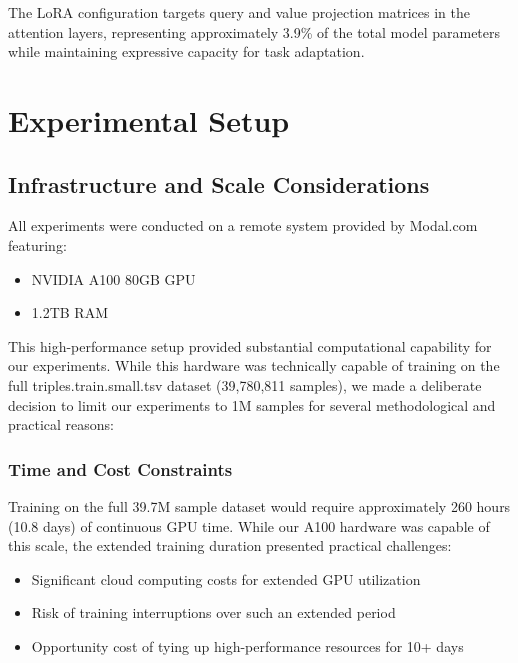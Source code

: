 \documentclass[conference]{IEEEtran}
\begin{document}
The LoRA configuration targets query and value projection matrices in the attention layers, representing approximately 3.9\% of the total model parameters while maintaining expressive capacity for task adaptation.

\section{Experimental Setup}
\subsection{Infrastructure and Scale Considerations}
All experiments were conducted on a remote system provided by Modal.com \cite{modal2023} featuring:
\begin{itemize}
\item NVIDIA A100 80GB GPU
\item 1.2TB RAM
\end{itemize}

This high-performance setup provided substantial computational capability for our experiments. While this hardware was technically capable of training on the full triples.train.small.tsv dataset (39,780,811 samples), we made a deliberate decision to limit our experiments to 1M samples for several methodological and practical reasons:

\subsubsection{Time and Cost Constraints}
Training on the full 39.7M sample dataset would require approximately 260 hours (10.8 days) of continuous GPU time. While our A100 hardware was capable of this scale, the extended training duration presented practical challenges:
\begin{itemize}
\item Significant cloud computing costs for extended GPU utilization
\item Risk of training interruptions over such an extended period
\item Opportunity cost of tying up high-performance resources for 10+ days
\end{itemize}
\end{document}
